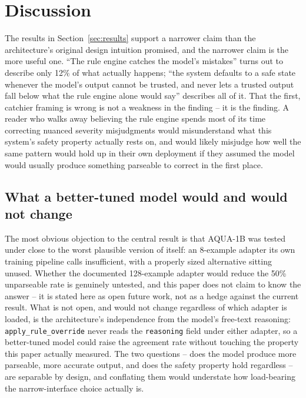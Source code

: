 \section{Discussion}
\label{sec:discussion}

The results in Section~\ref{sec:results} support a narrower claim than the architecture's original
design intuition promised, and the narrower claim is the more useful one. ``The rule engine catches
the model's mistakes'' turns out to describe only 12\% of what actually happens; ``the system
defaults to a safe state whenever the model's output cannot be trusted, and never lets a trusted
output fall below what the rule engine alone would say'' describes all of it. That the first,
catchier framing is wrong is not a weakness in the finding -- it is the finding. A reader who
walks away believing the rule engine spends most of its time correcting nuanced severity
misjudgments would misunderstand what this system's safety property actually rests on, and would
likely misjudge how well the same pattern would hold up in their own deployment if they assumed
the model would usually produce something parseable to correct in the first place.

\subsection{What a better-tuned model would and would not change}

The most obvious objection to the central result is that AQUA-1B was tested under close to the
worst plausible version of itself: an 8-example adapter its own training pipeline calls
insufficient, with a properly sized alternative sitting unused. Whether the documented 128-example
adapter would reduce the 50\% unparseable rate is genuinely untested, and this paper does not
claim to know the answer -- it is stated here as open future work, not as a hedge against the
current result. What is not open, and would not change regardless of which adapter is loaded, is
the architecture's independence from the model's free-text reasoning: \texttt{apply\_rule\_override}
never reads the \texttt{reasoning} field under either adapter, so a better-tuned model could raise
the agreement rate without touching the property this paper actually measured. The two questions
-- does the model produce more parseable, more accurate output, and does the safety property hold
regardless -- are separable by design, and conflating them would understate how load-bearing the
narrow-interface choice actually is.

